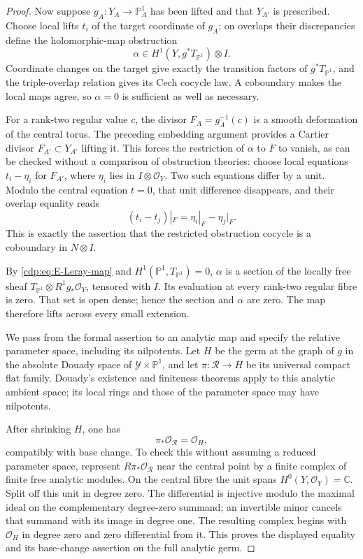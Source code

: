 \begin{proof}
Now suppose $g_A:Y_A\to\mathbb P^1_A$ has been lifted and that
$Y_{A'}$ is prescribed. Choose local lifts $t_i$ of the target
coordinate of $g_A$; on overlaps their discrepancies define the
holomorphic-map obstruction
\[
 \alpha\in H^1(Y,g^*T_{\mathbb P^1})\otimes I.
\]
Coordinate changes on the target give exactly the transition factors
of $g^*T_{\mathbb P^1}$, and the triple-overlap relation gives its
Cech cocycle law. A coboundary makes the local maps agree, so
$\alpha=0$ is sufficient as well as necessary.

For a rank-two regular value $c$, the divisor
$F_A=g_A^{-1}(c)$ is a smooth deformation of the central torus.
The preceding embedding argument provides a Cartier divisor
$F_{A'}\subset Y_{A'}$ lifting it. This forces the restriction
of $\alpha$ to $F$ to vanish, as can be checked without a comparison
of obstruction theories: choose local equations $t_i-\eta_i$ for
$F_{A'}$, where $\eta_i$ lies in $I\otimes\mathcal O_Y$.
Two such equations differ by a unit. Modulo the central equation
$t=0$, that unit difference disappears, and their overlap equality
reads
\[
 (t_i-t_j)|_F=\eta_i|_F-\eta_j|_F.
\]
This is exactly the assertion that the restricted obstruction
cocycle is a coboundary in $N\otimes I$.

By \eqref{cdp:eq:E-Leray-map} and $H^1(\mathbb P^1,T_{\mathbb P^1})=0$,
$\alpha$ is a section of the locally free sheaf
$T_{\mathbb P^1}\otimes R^1g_*\mathcal O_Y$, tensored with $I$.
Its evaluation at every rank-two regular fibre is zero. That set
is open dense; hence the section and $\alpha$ are zero. The map
therefore lifts across every small extension.

We pass from the formal assertion to an analytic map and
specify the relative parameter space, including its nilpotents.
Let $H$ be the germ at the graph of $g$ in the absolute Douady
space of $\mathcal Y\times\mathbb P^1$, and let
$\pi:\mathcal R\to H$ be its universal compact flat family.
Douady's existence and finiteness theorems
\cite[Section~9, Theorems~1--2, pp.~83--85]{Douady1966}
apply to this analytic ambient space; its local rings and those
of the parameter space may have nilpotents.

After shrinking $H$, one has
\[
 \pi_*\mathcal O_{\mathcal R}=\mathcal O_H,
\]
compatibly with base change. To check this without assuming a
reduced parameter space, represent $R\pi_*\mathcal O_{\mathcal R}$
near the central point by a finite complex of finite free analytic
modules. On the central fibre the unit spans
$H^0(Y,\mathcal O_Y)=\mathbb C$. Split off this unit in degree
zero. The differential is injective modulo the maximal ideal on
the complementary degree-zero summand; an invertible minor
cancels that summand with its image in degree one. The resulting
complex begins with $\mathcal O_H$ in degree zero and zero
differential from it. This proves the displayed equality and its
base-change assertion on the full analytic germ.


\end{proof}
